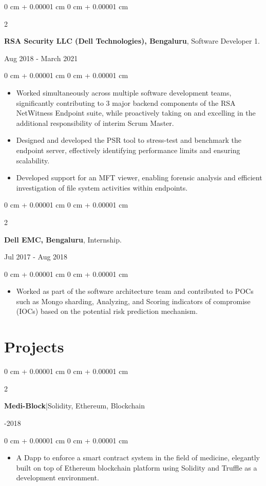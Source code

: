 \documentclass[10pt, letterpaper]{article}
\newenvironment{highlights}{
    \begin{itemize}[
        topsep=0.10 cm,
        parsep=0.10 cm,
        partopsep=0pt,
        itemsep=0pt,
        leftmargin=0 cm + 10pt
    ]
}{
    \end{itemize}
} %
\newenvironment{onecolentry}{
    \begin{adjustwidth}{
        0 cm + 0.00001 cm
    }{
        0 cm + 0.00001 cm
    }
}{
    \end{adjustwidth}
} %
\newenvironment{twocolentry}[2][]{
    \onecolentry
    \def\secondColumn{#2}
    \setcolumnwidth{\fill, 4.5 cm}
    \begin{paracol}{2}
}{
    \switchcolumn \raggedleft \secondColumn
    \end{paracol}
    \endonecolentry
} %
\begin{document}
        \begin{twocolentry}{Aug 2018 - March 2021}
         \textbf{RSA Security LLC (Dell Technologies), Bengaluru}, Software Developer 1.
        \end{twocolentry}
        \vspace{0.10 cm}
        \begin{onecolentry}
          \begin{highlights}
             \item Worked simultaneously across multiple software development teams, significantly contributing to 3 major backend components of the RSA NetWitness Endpoint suite, while proactively taking on and excelling in the additional responsibility of interim Scrum Master.
                \item Designed and developed the PSR tool to stress-test and benchmark the endpoint server, effectively identifying performance limits and ensuring scalability.
             \item Developed support for an MFT viewer, enabling forensic analysis and efficient investigation of file system activities within endpoints.
         \end{highlights}
        \end{onecolentry}

        \vspace{0.2 cm}

        \begin{twocolentry}{Jul 2017 - Aug 2018}
            \textbf{Dell EMC, Bengaluru}, Internship.
        \end{twocolentry}
        \vspace{0.10 cm}
        \begin{onecolentry}
          \begin{highlights}
              \item Worked as part of the software architecture team and contributed to POCs such as Mongo sharding, Analyzing, and Scoring indicators of compromise (IOCs) based on the potential risk prediction mechanism.
            \end{highlights}
        \end{onecolentry}


    \section{Projects}

        \begin{twocolentry}{2017-2018}
            \textbf{Medi-Block}|Solidity, Ethereum, Blockchain
        \end{twocolentry}
        \begin{onecolentry}
          \begin{highlights}
                \item A Dapp to enforce a smart contract system in the field of medicine, elegantly built on top of Ethereum blockchain platform using Solidity and Truffle as a development environment.
         \end{highlights}
        \end{onecolentry}
\end{document}
